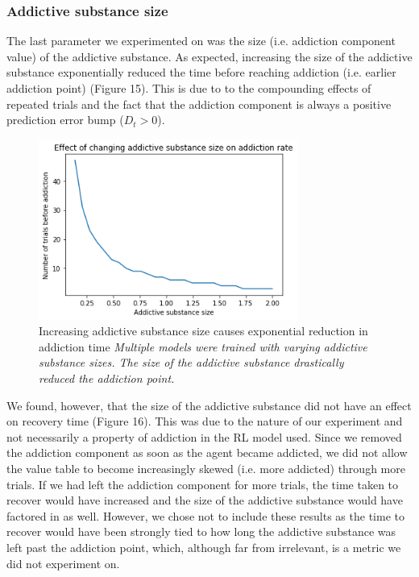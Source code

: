 \documentclass[10pt,letterpaper]{article}
\begin{document}
\vspace{3em}

\subsubsection{Addictive substance size}
The last parameter we experimented on was the size (i.e. addiction component value) of the addictive substance. As expected, increasing the size of the addictive substance exponentially reduced the time before reaching addiction (i.e. earlier addiction point) (Figure 15). This is due to to the compounding effects of repeated trials and the fact that the addiction component is always a positive prediction error bump ($D_t > 0$).

\begin{figure}[H]
   \centering
    \includegraphics[width = 85mm]{graphs/substance_addiction.png}
    \caption{Increasing addictive substance size causes exponential reduction in addiction time
    \newline \emph{Multiple models were trained with varying addictive substance sizes. The size of the addictive substance drastically reduced the addiction point.}}
    \label{fig:Baseline}
\end{figure}

We found, however, that the size of the addictive substance did not have an effect on recovery time (Figure 16). This was due to the nature of our experiment and not necessarily a property of addiction in the RL model used. Since we removed the addiction component as soon as the agent became addicted, we did not allow the value table to become increasingly skewed (i.e. more addicted) through more trials. If we had left the addiction component for more trials, the time taken to recover would have increased and the size of the addictive substance would have factored in as well. However, we chose not to include these results as the time to recover would have been strongly tied to how long the addictive substance was left past the addiction point, which, although far from irrelevant, is a metric we did not experiment on.
\end{document}
